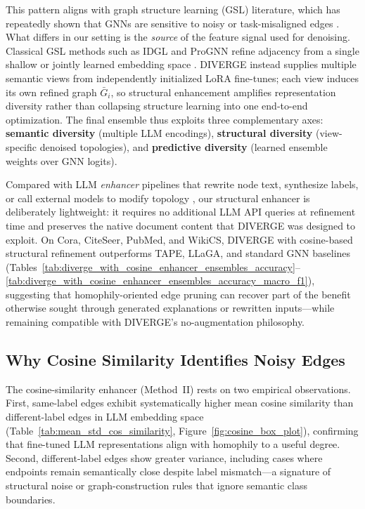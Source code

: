 \documentclass{article}
\begin{document}
This pattern aligns with graph structure learning (GSL) literature, which has repeatedly
shown that GNNs are sensitive to noisy or task-misaligned edges
\citep{jin2020prognn,chen2020idgl,dong2023gps}. What differs in our setting is the
\emph{source} of the feature signal used for denoising. Classical GSL methods such as
IDGL and ProGNN refine adjacency from a single shallow or jointly learned embedding
space \citep{chen2020idgl,jin2020prognn}. DIVERGE instead supplies multiple semantic
views from independently initialized LoRA fine-tunes; each view induces its own refined
graph $\bar{G}_i$, so structural enhancement amplifies representation diversity rather
than collapsing structure learning into one end-to-end optimization. The final ensemble
thus exploits three complementary axes: \textbf{semantic diversity} (multiple LLM
encodings), \textbf{structural diversity} (view-specific denoised topologies), and
\textbf{predictive diversity} (learned ensemble weights over GNN logits).

Compared with LLM \emph{enhancer} pipelines that rewrite node text, synthesize labels,
or call external models to modify topology
\citep{he2024harnessing,Sun2026TopologicalEnhancerTAG,guo2024graphedit,zhang2025leveraging},
our structural enhancer is deliberately lightweight: it requires no additional LLM API
queries at refinement time and preserves the native document content that DIVERGE was
designed to exploit. On Cora, CiteSeer, PubMed, and WikiCS, DIVERGE with cosine-based
structural refinement outperforms TAPE, LLaGA, and standard GNN baselines
(Tables~\ref{tab:diverge_with_cosine_enhancer_ensembles_accuracy}--\ref{tab:diverge_with_cosine_enhancer_ensembles_accuracy_macro_f1}),
suggesting that homophily-oriented edge pruning can recover part of the benefit otherwise
sought through generated explanations or rewritten inputs---while remaining compatible
with DIVERGE's no-augmentation philosophy.


\subsection{Why Cosine Similarity Identifies Noisy Edges}
\label{sec:disc-cosine}

The cosine-similarity enhancer (Method~II) rests on two empirical observations. First,
same-label edges exhibit systematically higher mean cosine similarity than
different-label edges in LLM embedding space (Table~\ref{tab:mean_std_cos_similarity},
Figure~\ref{fig:cosine_box_plot}), confirming that fine-tuned LLM representations align
with homophily to a useful degree. Second, different-label edges show greater variance,
including cases where endpoints remain semantically close despite label mismatch---a
signature of structural noise or graph-construction rules that ignore semantic class
boundaries.
\end{document}

